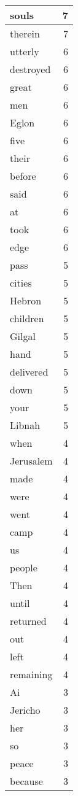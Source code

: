 \begin{center}
\begin{longtable}{l|r}
souls & 7 \\ \hline
therein & 7 \\ \hline
utterly & 6 \\ \hline
destroyed & 6 \\ \hline
great & 6 \\ \hline
men & 6 \\ \hline
Eglon & 6 \\ \hline
five & 6 \\ \hline
their & 6 \\ \hline
before & 6 \\ \hline
said & 6 \\ \hline
at & 6 \\ \hline
took & 6 \\ \hline
edge & 6 \\ \hline
pass & 5 \\ \hline
cities & 5 \\ \hline
Hebron & 5 \\ \hline
children & 5 \\ \hline
Gilgal & 5 \\ \hline
hand & 5 \\ \hline
delivered & 5 \\ \hline
down & 5 \\ \hline
your & 5 \\ \hline
Libnah & 5 \\ \hline
when & 4 \\ \hline
Jerusalem & 4 \\ \hline
made & 4 \\ \hline
were & 4 \\ \hline
went & 4 \\ \hline
camp & 4 \\ \hline
us & 4 \\ \hline
people & 4 \\ \hline
Then & 4 \\ \hline
until & 4 \\ \hline
returned & 4 \\ \hline
out & 4 \\ \hline
left & 4 \\ \hline
remaining & 4 \\ \hline
Ai & 3 \\ \hline
Jericho & 3 \\ \hline
her & 3 \\ \hline
so & 3 \\ \hline
peace & 3 \\ \hline
because & 3 \\ \hline

\end{longtable}
\end{center}
